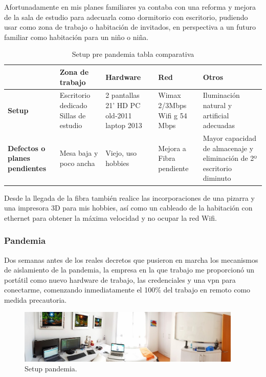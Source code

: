 Afortunadamente en mis planes familiares ya contaba con una reforma y mejora de la sala de estudio para adecuarla como dormitorio con escritorio, pudiendo usar como zona de trabajo o habitación de invitados, en perspectiva a un futuro familiar como habitación para un niño o niña.

\begin{table}[htb]
    \centering
    \caption{Setup pre pandemia tabla comparativa}
    \label{T:comp_setup_prepandemia}
    \begin{tabular}{|p{2.5cm}|p{2.5cm}|p{2.5cm}|p{2.5cm}|p{2.5cm}|}
    \hline   \hline
        ~ & \textbf{Zona de trabajo} & \textbf{Hardware} & \textbf{Red} & \textbf{Otros} \\ \hline
        \textbf{Setup} & Escritorio dedicado Sillas de estudio & 2 pantallas 21’ HD PC old-2011 laptop 2013 & Wimax 2/3Mbps Wifi g 54 Mbps & Iluminación  natural y artificial adecuadas \\ \hline
       \textbf{Defectos o planes pendientes} & Mesa baja y poco ancha & Viejo, uso hobbies & Mejora a Fibra pendiente  & Mayor capacidad de almacenaje y eliminación de 2º escritorio diminuto  \\ \hline
    \end{tabular}
\end{table}

 Desde la llegada de la fibra también realice las incorporaciones de una pizarra y una impresora 3D para mis hobbies, así como un cableado de la habitación con ethernet para obtener la máxima velocidad y no ocupar la red Wifi.

 \subsubsection{Pandemia}\label{S:setup_pandemia}
 Dos semanas antes de los reales decretos que pusieron en marcha los mecanismos de aislamiento de la pandemia, la empresa en la que trabajo me proporcionó un portátil como nuevo hardware de trabajo, las credenciales y una vpn para conectarme, comenzando inmediatamente el 100\% del trabajo en remoto como medida precautoria.
 
\begin{figure}[!htb]
\begin{center}
\includegraphics[width=0.95\textwidth]{./figuras/setup_uno.jpg}
\caption{Setup pandemia.}
\label{F:setup_uno}
\end{center}
\end{figure}

